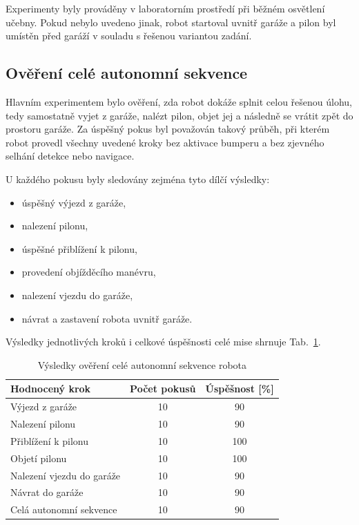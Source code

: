\documentclass[a4paper,11pt]{article}
\begin{document}
Experimenty byly prováděny v laboratorním prostředí při běžném osvětlení učebny. Pokud nebylo uvedeno jinak, robot startoval uvnitř garáže a pilon byl umístěn před garáží v souladu s řešenou variantou zadání.

\subsection{Ověření celé autonomní sekvence}
Hlavním experimentem bylo ověření, zda robot dokáže splnit celou řešenou úlohu, tedy samostatně vyjet z garáže, nalézt pilon, objet jej a následně se vrátit zpět do prostoru garáže. Za úspěšný pokus byl považován takový průběh, při kterém robot provedl všechny uvedené kroky bez aktivace bumperu a bez zjevného selhání detekce nebo navigace.

U každého pokusu byly sledovány zejména tyto dílčí výsledky:
\begin{itemize}[leftmargin=1.2cm]
    \item úspěšný výjezd z garáže,
    \item nalezení pilonu,
    \item úspěšné přiblížení k pilonu,
    \item provedení objížděcího manévru,
    \item nalezení vjezdu do garáže,
    \item návrat a zastavení robota uvnitř garáže.
\end{itemize}

Výsledky jednotlivých kroků i celkové úspěšnosti celé mise shrnuje Tab.~\ref{tab:full_sequence}.

\begin{table}[H]
  \centering
  \begin{tabular}{lcc}
    \toprule
    \textbf{Hodnocený krok} & \textbf{Počet pokusů} & \textbf{Úspěšnost [\%]} \\
    \midrule
    Výjezd z garáže & 10 & 90 \\
    Nalezení pilonu & 10 & 90 \\
    Přiblížení k pilonu & 10 & 100 \\
    Objetí pilonu & 10 & 100 \\
    Nalezení vjezdu do garáže & 10 & 90 \\
    Návrat do garáže & 10 & 90 \\
    Celá autonomní sekvence & 10 & 90 \\
    \bottomrule
  \end{tabular}
  \caption{Výsledky ověření celé autonomní sekvence robota}
  \label{tab:full_sequence}
\end{table}
\end{document}
